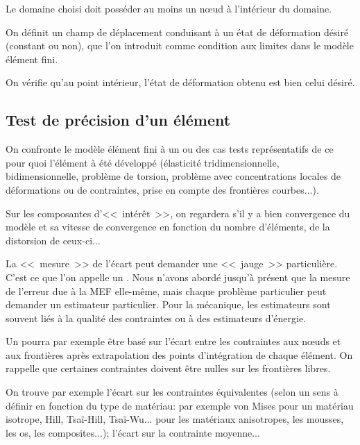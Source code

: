 Le domaine choisi doit posséder au moins un nœud à l'intérieur du domaine.

On définit un champ de déplacement conduisant à un état de déformation
désiré (constant ou non), que l'on introduit comme condition aux limites dans le modèle élément fini.

On vérifie qu'au point intérieur, l'état de déformation obtenu est bien celui
désiré.

\medskip
\subsection{Test de précision d'un élément}

On confronte le modèle élément fini à un ou des cas tests représentatifs de ce pour
quoi l'élément à été développé (élasticité tridimensionnelle,
bidimensionnelle, problème de torsion, problème avec concentrations locales de
déformations ou de contraintes, prise en compte des frontières courbes...).

Sur les composantes d'<<~intérêt~>>, on regardera s'il y a bien convergence
du modèle et sa vitesse de convergence en fonction du nombre d'éléments,
de la distorsion de ceux-ci...

\medskip
La <<~mesure~>> de l'écart peut demander une <<~jauge~>> particulière.
C'est ce que l'on appelle un .
Nous n'avons abordé jusqu'à présent que la mesure de l'erreur due à la
MEF elle-même, mais chaque problème particulier peut demander un
estimateur particulier.
Pour la mécanique, les estimateurs sont souvent liés à la qualité des
contraintes ou à des estimateurs d'énergie.

\medskip
Un  pourra par exemple être basé
sur l'écart entre les contraintes aux nœuds et aux frontières après
extrapolation des points d'intégration de chaque élément. On rappelle
que certaines contraintes doivent être nulles sur les frontières libres.

On trouve par exemple l'écart sur les contraintes équivalentes (selon un
sens à définir en fonction du type de matériau: par exemple von Mises
pour un matériau isotrope, Hill,
Tsaï-Hill,
Tsaï-Wu...
pour les matériaux anisotropes, les mousses, les os, les composites...);
l'écart sur la contrainte moyenne...

